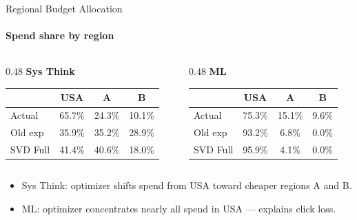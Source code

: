 \documentclass[smaller]{beamer}
\begin{document}
\begin{frame}{Regional Budget Allocation}
\framesubtitle{Spend share by region}

\begin{columns}[T]
\begin{column}{0.48\textwidth}
\centering
\textbf{Sys Think}
\smallskip

\begin{tabular}{lccc}
\toprule
 & USA & A & B \\
\midrule
Actual   & 65.7\% & 24.3\% & 10.1\% \\
Old exp  & 35.9\% & 35.2\% & 28.9\% \\
SVD Full & 41.4\% & 40.6\% & 18.0\% \\
\bottomrule
\end{tabular}
\end{column}
\begin{column}{0.48\textwidth}
\centering
\textbf{ML}
\smallskip

\begin{tabular}{lccc}
\toprule
 & USA & A & B \\
\midrule
Actual   & 75.3\% & 15.1\% &  9.6\% \\
Old exp  & 93.2\% &  6.8\% &  0.0\% \\
SVD Full & 95.9\% &  4.1\% &  0.0\% \\
\bottomrule
\end{tabular}
\end{column}
\end{columns}

\medskip
\begin{itemize}
    \item Sys Think: optimizer shifts spend from USA toward cheaper regions A and B.
    \item ML: optimizer concentrates nearly all spend in USA --- explains click loss.
\end{itemize}

\end{frame}
\end{document}
